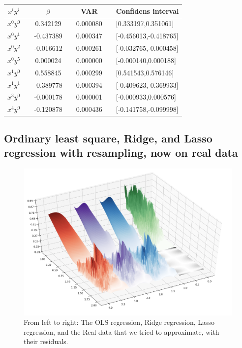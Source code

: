  \begin{center}
\label{tab:lasso-var-conf}
\begin{tabularx}{\textwidth}{c X c X c X l}
    \hline
    \hline
        $x^iy^j$ && $\beta$ && VAR && Confidens interval\\
    \hline
        $x^0y^0$ && 0.342129   && 0.000080   && [0.333197,0.351061] \\
        $x^0y^1$ && -0.437389  && 0.000347   && [-0.456013,-0.418765] \\
        $x^0y^2$ && -0.016612  && 0.000261   && [-0.032765,-0.000458] \\
        $x^0y^5$ && 0.000024   && 0.000000   && [-0.000140,0.000188] \\
        $x^1y^0$ && 0.558845   && 0.000299   && [0.541543,0.576146] \\
        $x^1y^1$ && -0.389778  && 0.000394   && [-0.409623,-0.369933] \\
        $x^3y^0$ && -0.000178  && 0.000001   && [-0.000933,0.000576] \\
        $x^4y^0$ && -0.120878  && 0.000436   && [-0.141758,-0.099998] \\
    \hline
\end{tabularx}
\end{center}


 
\subsection{Ordinary least square, Ridge, and Lasso regression with resampling, now on real data}

\begin{figure}[H]
		\centering
		\includegraphics[width=1.1\linewidth]{result/bilder/all_real.png}
		\caption{From left to right: The \color{red}OLS \color{black} regression, \color{purple}{} Ridge \color{black} regression, \color{blue} Lasso \color{black} regression, and the \color{green}Real data \color{black} that we tried to approximate, with their residuals.}
		\label{fig:RealData}
\end{figure}


